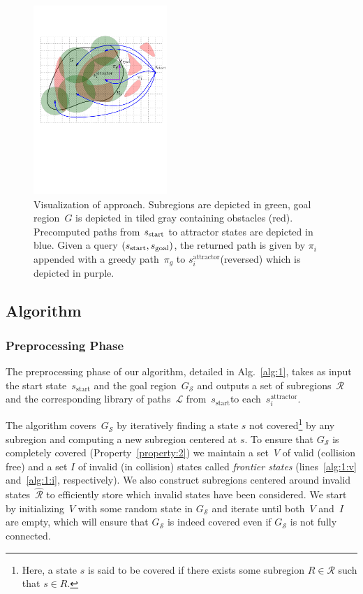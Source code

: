 \documentclass[letterpaper]{article} %
\newcommand{\calL}{\ensuremath{\mathcal{L}}\xspace}
\newcommand{\calS}{\ensuremath{\mathcal{S}}\xspace}
\newcommand{\calR}{\ensuremath{\mathcal{R}}\xspace}
\newcommand{\sAttract}{\ensuremath{s^{\text{attractor}}_i}\xspace}
\newcommand{\sStart}{\ensuremath{s_{\text{start}}\xspace}}
\begin{document}
\begin{figure}
\centering
\includegraphics[width=0.45\textwidth]{Approach-new2.pdf}
  \caption{
  Visualization of approach. Subregions are depicted in green, 
  goal region~$G$ is depicted in tiled gray  containing obstacles (red).
  Precomputed paths from $s_{\rm{start}}$ to attractor states are depicted in blue.
 Given a query $(s_{\rm{start}}, s_{\rm{goal}})$, the returned path is given by $\pi_i$ appended with a greedy path~$\pi_g$ to \sAttract (reversed) which is depicted in purple.
}
   	\label{fig:approach}
\end{figure}

\subsection {Algorithm}
\label{subsec:alg}
\subsubsection{Preprocessing Phase}
The preprocessing phase of our algorithm, detailed in Alg.~\ref{alg:1}, takes as input the start state~$\sStart$ and the goal region~$G_\calS$ and outputs a set of subregions~$\calR$ and the corresponding library of paths~$\calL$ from~\sStart to each~\sAttract. 

The algorithm covers~$G_\calS$ by iteratively finding a state $s$ not covered\footnote{Here, a state $s$ is said to be covered if there exists some subregion $R \in \calR$ such that $s \in R$.} by any subregion and computing a new subregion centered at $s$.
To ensure that $G_\calS$ is completely covered (Property~\ref{property:2}) we maintain a set~$V$ of valid (collision free) and a set $I$ of invalid (in collision) states called \emph{frontier states} (lines~\ref{alg:1:v} and~\ref{alg:1:i}, respectively).
We also construct subregions centered around invalid states~$\hat{\calR}$ to efficiently store which invalid states have been considered.
We start by initializing~$V$ with some random state in $G_\calS$ and iterate until both~$V$ and~$I$ are empty, which will ensure that $G_\calS$ is indeed covered even if $G_\calS$ is not fully connected.
\end{document}

